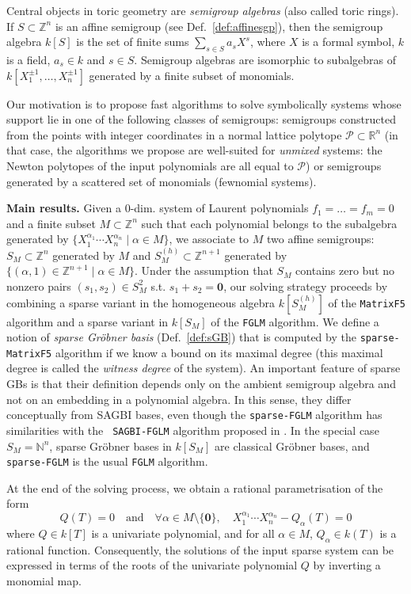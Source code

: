 \documentclass[12pt]{article}
\numberwithin{equation}{section}
\numberwithin{theorem}{section}
\newcommand{\Z}{\mathbb{Z}}
\newcommand{\sgp}{S}
\newcommand{\polytope}{\mathscr P}
\newcommand{\R}{\mathbb{R}}
\newcommand{\N}{\mathbb{N}}
\begin{document}
Central objects in toric geometry are \emph{semigroup algebras} (also
called toric rings).  If $\sgp\subset \Z^n$ is an affine semigroup
(see Def.~\ref{def:affinesgp}), then the semigroup algebra $k[\sgp]$
is the set of finite sums $\sum_{s\in\sgp} a_s X^s$, where $X$ is a
formal symbol, $k$ is a field, $a_s\in k$ and $s\in\sgp$. Semigroup
algebras are isomorphic to sub\-algebras of $k[X_1^{\pm 1},\ldots, X_n^{\pm 1}]$
generated by a finite subset of monomials.


Our motivation is to propose fast algorithms to solve
symbolically systems whose support lie in one of the following classes
of semigroups: semigroups constructed from the points with integer coordinates
in a normal lattice polytope $\polytope\subset\R^n$ (in that case, the
algorithms we propose are well-suited for \emph{unmixed} systems: the
Newton polytopes of the input polynomials are all equal to $\polytope$) or
semigroups generated by a scattered set of monomials (fewnomial
systems).




{\bf Main results.}  
Given a $0$-dim. system of Laurent polynomials $f_1=\dots=f_m=0$ and a
finite subset $M\subset\Z^n$ such that each polynomial
belongs to the subalgebra generated by $\{X_1^{\alpha_1}\cdots
X_n^{\alpha_n}\mid \alpha\in M\}$, we associate to $M$ two affine
semigroups: $\sgp_M\subset\Z^n$ generated by $M$ and
$\sgp_M^{(h)}\subset\Z^{n+1}$ generated by
$\{(\alpha,1)\in\Z^{n+1}\mid \alpha\in M\}$. Under the assumption that
$\sgp_M$ contains zero but no nonzero pairs $(s_1,s_2)\in S_M^2$
s.t. $s_1+s_2=\mathbf 0$, our solving strategy proceeds by combining a
sparse variant in the homogeneous algebra $k[\sgp_M^{(h)}]$ of the
{\tt MatrixF5} algorithm and a sparse variant in $k[\sgp_M]$ of the {\tt FGLM}
algorithm. We define a notion of \emph{sparse Gr\"obner basis}
(Def.~\ref{def:sGB}) that is computed by the {\tt sparse-MatrixF5} algorithm
if we know a bound on its maximal degree (this maximal degree is
called the \emph{witness degree} of the system).
An important feature of sparse GBs is that their definition depends
only on the ambient semigroup algebra and not on an embedding in a polynomial
algebra.
In this sense, they differ conceptually from SAGBI bases, even though
the {\tt sparse-FGLM} algorithm has similarities with the {\tt
  SAGBI-FGLM} algorithm proposed in \cite{FR09}. In the special case $S_M=\N^n$,
sparse Gr\"obner bases in $k[S_M]$ are classical Gr\"obner bases, and {\tt sparse-FGLM} is the usual {\tt FGLM} algorithm.

At the end of the solving
process, we obtain a rational parametrisation of the form
\[Q(T)=0 \quad \text{and} \quad \forall \alpha\in M\setminus\{\mathbf 0\},\quad X_1^{\alpha_1}\cdots X_n^{\alpha_n}-Q_{\alpha}(T)=0\]
where $Q\in k[T]$ is a univariate polynomial, and for all $\alpha\in M$, $Q_{\alpha}\in k(T)$ is a rational function.
Consequently, the solutions of the input sparse system 
can be expressed in terms of the roots of the univariate polynomial $Q$ by inverting a monomial map.
\end{document}
